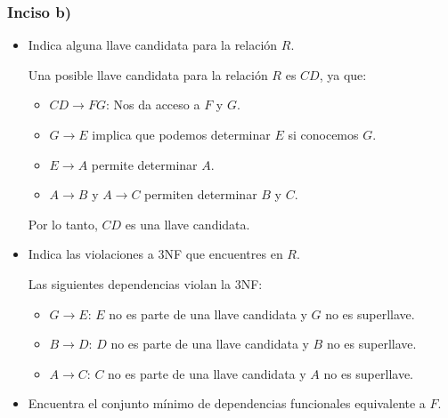 \subsubsection*{Inciso b)}
\begin{itemize}
	\item Indica alguna llave candidata para la relación \( R \).
	
	Una posible llave candidata para la relación \( R \) es \( CD \), ya que:
	\begin{itemize}
		\item \( CD \rightarrow FG \): Nos da acceso a \( F \) y \( G \).
		\item \( G \rightarrow E \) implica que podemos determinar \( E \) si conocemos \( G \).
		\item \( E \rightarrow A \) permite determinar \( A \).
		\item \( A \rightarrow B \) y \( A \rightarrow C \) permiten determinar \( B \) y \( C \).
	\end{itemize}
	Por lo tanto, \( CD \) es una llave candidata.
	\vspace*{.3cm}
	
	\item Indica las violaciones a 3NF que encuentres en \( R \).
	
	Las siguientes dependencias violan la 3NF:
	\begin{itemize}
		\item \( G \rightarrow E \): \( E \) no es parte de una llave candidata y \( G \) no es superllave.
		\item \( B \rightarrow D \): \( D \) no es parte de una llave candidata y \( B \) no es superllave.
		\item \( A \rightarrow C \): \( C \) no es parte de una llave candidata y \( A \) no es superllave.
	\end{itemize}
	\vspace*{.3cm}
	
	\item Encuentra el conjunto mínimo de dependencias funcionales equivalente a \( F \).
	

\end{itemize}
